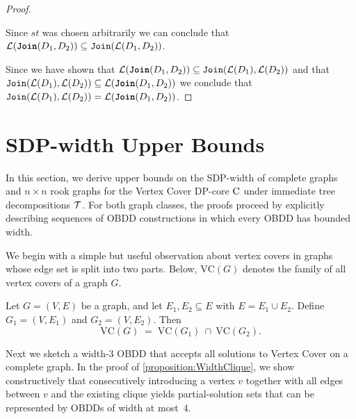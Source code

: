\begin{proof}
\begin{itemize}
    \end{itemize}

    Since $st$ was chosen arbitrarily we can conclude that $\mathcal{L}(\texttt{\textbf{Join}}(D_1,D_2)) \subseteq \texttt{Join}(\mathcal{L}(D_1,D_2))$.

    Since we have shown that $\mathcal{L}(\texttt{\textbf{Join}}(D_1,D_2)) \subseteq \texttt{Join}(\mathcal{L}(D_1),\mathcal{L}(D_2))$ and that $\texttt{Join}(\mathcal{L}(D_1),\mathcal{L}(D_2)) \subseteq \mathcal{L}(\texttt{\textbf{Join}}(D_1,D_2))$ we conclude that $\texttt{Join}(\mathcal{L}(D_1),\mathcal{L}(D_2)) = \mathcal{L}(\texttt{\textbf{Join}}(D_1,D_2))$.
     
\end{proof}


\section{SDP-width Upper Bounds}

In this section, we derive upper bounds on the SDP-width of complete graphs and
$n \times n$ rook graphs for the {\sc Vertex Cover} DP-core $\mathrm{C}$ under
immediate tree decompositions $\mathcal{T}$. For both graph classes, the proofs
proceed by explicitly describing sequences of OBDD constructions in which every
OBDD has bounded width.

We begin with a simple but useful observation about vertex covers in graphs whose edge set is split into two parts. Below, $\mathrm{VC}(G)$ denotes the family of all vertex covers of a graph $G$.

\begin{observation}
Let $G=(V,E)$ be a graph, and let $E_1,E_2\subseteq E$ with $E = E_1 \cup E_2$.
Define $G_1=(V,E_1)$ and $G_2=(V,E_2)$.
Then
\[
\mathrm{VC}(G) \;=\; \mathrm{VC}(G_1)\ \cap\ \mathrm{VC}(G_2).
\]
\end{observation}


Next we sketch a width-$3$ OBDD that accepts all solutions to
{\sc Vertex Cover} on a complete graph. In the proof of
\cref{proposition:WidthClique}, we show constructively that consecutively
introducing a vertex $v$ together with all edges between $v$ and the existing
clique yields partial-solution sets that can be represented by OBDDs of width at
most~$4$.

